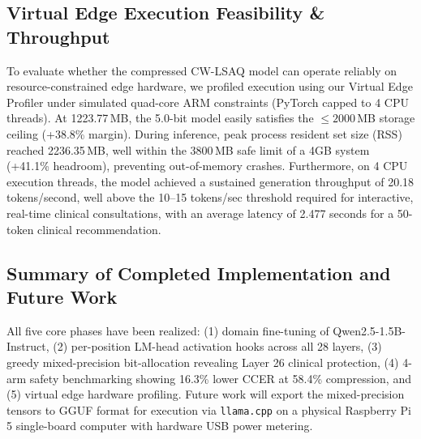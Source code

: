 \documentclass[conference]{IEEEtran}
\begin{document}
\subsection{Virtual Edge Execution Feasibility \& Throughput}
To evaluate whether the compressed CW-LSAQ model can operate reliably on resource-constrained edge hardware, we profiled execution using our Virtual Edge Profiler under simulated quad-core ARM constraints (PyTorch capped to 4 CPU threads). At 1223.77\,MB, the 5.0-bit model easily satisfies the $\le 2000$\,MB storage ceiling (+38.8\% margin). During inference, peak process resident set size (RSS) reached 2236.35\,MB, well within the 3800\,MB safe limit of a 4GB system (+41.1\% headroom), preventing out-of-memory crashes. Furthermore, on 4 CPU execution threads, the model achieved a sustained generation throughput of 20.18 tokens/second, well above the 10--15 tokens/sec threshold required for interactive, real-time clinical consultations, with an average latency of 2.477 seconds for a 50-token clinical recommendation.

\subsection{Summary of Completed Implementation and Future Work}
All five core phases have been realized: (1) domain fine-tuning of Qwen2.5-1.5B-Instruct, (2) per-position LM-head activation hooks across all 28 layers, (3) greedy mixed-precision bit-allocation revealing Layer 26 clinical protection, (4) 4-arm safety benchmarking showing 16.3\% lower CCER at 58.4\% compression, and (5) virtual edge hardware profiling. Future work will export the mixed-precision tensors to GGUF format for execution via \texttt{llama.cpp} on a physical Raspberry Pi 5 single-board computer with hardware USB power metering.
\end{document}
